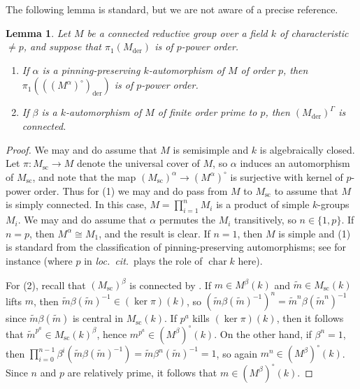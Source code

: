\documentclass[reqno]{amsart}
\numberwithin{equation}{subsection}
\newcommand{\wt}[1]{\widetilde{#1}}
\newcommand{\co}{\colon}
\DeclareMathOperator{\der}{der}
\newtheorem{lemma}[thm]{Lemma}
\theoremstyle{remark}
\numberwithin{equation}{subsection}
\numberwithin{figure}{subsection}
\begin{document}
The following lemma is standard, but we are not aware of a precise reference.

\begin{lemma}\label{lemma:pinning-preserving-fundamental-group}
    Let $M$ be a connected reductive group over a field $k$ of characteristic $\neq p$, and suppose that $\pi_1(M_{\der})$ is of $p$-power order. 
    \begin{enumerate}
        \item If $\alpha$ is a pinning-preserving $k$-automorphism of $M$ of order $p$, then $\pi_1(((M^\alpha)^\circ)_{\der})$ is of $p$-power order.
        \item If $\beta$ is a $k$-automorphism of $M$ of finite order prime to $p$, then $(M_{\der})^\Gamma$ is connected.
    \end{enumerate}
\end{lemma}

\begin{proof}
    We may and do assume that $M$ is semisimple and $k$ is algebraically closed. Let $\pi\co M_{\mathrm{sc}} \to M$ denote the universal cover of $M$, so $\alpha$ induces an automorphism of $M_{\mathrm{sc}}$, and note that the map $(M_{\mathrm{sc}})^\alpha \to (M^\alpha)^\circ$ is surjective with kernel of $p$-power order. Thus for (1) we may and do pass from $M$ to $M_{\mathrm{sc}}$ to assume that $M$ is simply connected. In this case, $M = \prod_{i=1}^n M_i$ is a product of simple $k$-groups $M_i$. We may and do assume that $\alpha$ permutes the $M_i$ transitively, so $n \in \{1, p\}$. If $n = p$, then $M^\alpha \cong M_1$, and the result is clear. If $n = 1$, then $M$ is simple and (1) is standard from the classification of pinning-preserving automorphisms; see for instance \cite[Lemma 5.5]{Cot22} (where $p$ in \textit{loc.\ cit.}\ plays the role of $\operatorname{char} k$ here).

    For (2), recall that $(M_{\mathrm{sc}})^\beta$ is connected by \cite[Theorem 8.1]{St68}. If $m \in M^\beta(k)$ and $\wt m \in M_{\mathrm{sc}}(k)$ lifts $m$, then $\wt m \beta(\wt m)^{-1} \in (\ker \pi)(k)$, so $(\wt m \beta(\wt m)^{-1})^n = \wt m^n \beta(\wt m^n)^{-1}$ since $\wt m \beta(\wt m)$ is central in $M_{\mathrm{sc}}(k)$. If $p^a$ kills $(\ker \pi)(k)$, then it follows that $\wt m^{p^a} \in M_{\mathrm{sc}}(k)^\beta$, hence $m^{p^a} \in (M^\beta)^\circ(k)$. On the other hand, if $\beta^n = 1$, then $\prod_{i=0}^{n-1} \beta^i(\wt m \beta(\wt m)^{-1}) = \wt m \beta^n(\wt m)^{-1} = 1$, so again $m^n \in (M^\beta)^\circ(k)$. Since $n$ and $p$ are relatively prime, it follows that $m \in (M^\beta)^\circ(k)$.
\end{proof}
\end{document}
